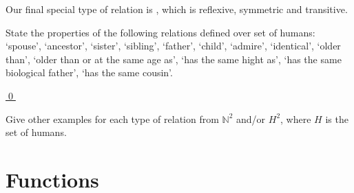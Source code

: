 \documentclass[11pt]{article}
\begin{document}
{\item Our final special type of relation is , which
is reflexive, symmetric and transitive.

\hrulefill
\begin{uexercise}\label{ex-relprop}
State the properties of the following relations defined over set of
humans: `spouse', `ancestor', `sister', `sibling', `father', `child', `admire',
`identical', `older than', `older than or at the same age as', `has the same hight as', `has the same biological
father', `has the same cousin'.

\hyperlink{ex-relprop-sol}{\qed}
\end{uexercise}

\begin{uexercise}
Give other examples for each type of relation from $\mathbb{N}^2$ and/or
$H^2$, where $H$ is the set of humans.
\end{uexercise}

\hrulefill
}

\section{Functions}
\end{document}
